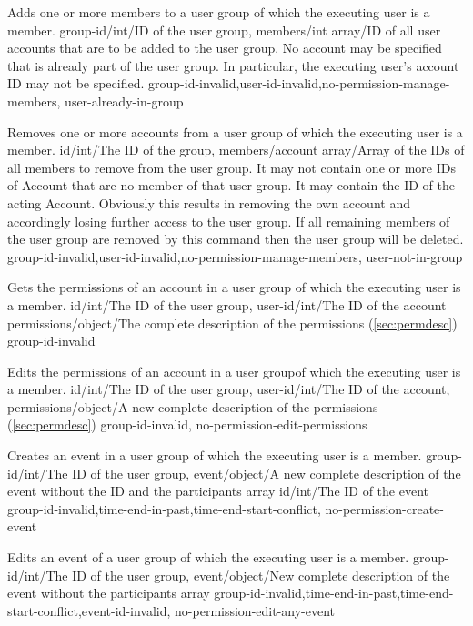 \documentclass[parskip=full,11pt]{scrartcl}
\begin{document}
{Adds one or more members to a user group of which the executing user is a
member.}
{group-id/int/ID of the user group,
members/int array/ID of all user accounts that are to be added to the user
group.
No account may be specified that is already part of the user group.
In particular{,} the executing user's account ID may not be specified.}
{}
{group-id-invalid,user-id-invalid,no-permission-manage-members,%
user-already-in-group}
{}

{Removes one or more accounts from a user group of which the executing user is
a member.}
{id/int/The ID of the group,
members/account array/Array of the IDs of all members to remove from the user
group. It may not contain one or more IDs of Account that are no member of that
user group. It may contain the ID of the acting Account. Obviously this results
in removing the own account and accordingly losing further access to the user
group. If all remaining members of the user group are removed by this command
then the user group will be deleted.}
{}
{group-id-invalid,user-id-invalid,no-permission-manage-members,
user-not-in-group}
{}

{Gets the permissions of an account in a user group of which the executing user is
a member.}
{id/int/The ID of the user group,
user-id/int/The ID of the account}
{permissions/object/The complete description of the permissions
(\ref{sec:permdesc})}
{group-id-invalid}
{}

{Edits the permissions of an account in a user groupof which the executing user
is a member.}
{id/int/The ID of the user group,
user-id/int/The ID of the account,
permissions/object/A new complete description of the permissions
(\ref{sec:permdesc})}
{}
{group-id-invalid, no-permission-edit-permissions}
{}

{Creates an event in a user group of which the executing user is a member.}
{group-id/int/The ID of the user group,
event/object/A new complete description of the event
without the ID and the participants array}
{id/int/The ID of the event}
{group-id-invalid,time-end-in-past,time-end-start-conflict,
no-permission-create-event}
{}

{Edits an event of a user group of which the executing user is a member.}
{group-id/int/The ID of the user group,
event/object/New complete description of the event without the participants
array}
{}
{group-id-invalid,time-end-in-past,time-end-start-conflict,event-id-invalid,
no-permission-edit-any-event}
{}
\end{document}
